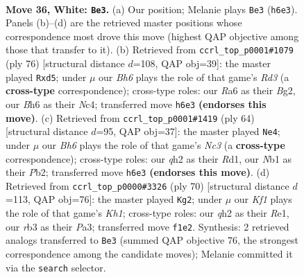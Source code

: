 \documentclass[11pt]{article}
\begin{document}
\clearpage

\begin{figure}[p]\centering
\begin{subfigure}{0.46\textwidth}\centering
\resizebox{\linewidth}{!}{%
\newchessgame
\chessboard[
  setfen={nr4k1/Q4pb1/R6B/4p3/4P3/1r3n2/1P3RNq/1N3K2 w - - 2 36},
  showmover=false,
  pgfstyle=straightmove, color=movearrow, markmove={h6-e3}
]}
\caption{}
\end{subfigure}\hfill
\begin{subfigure}{0.46\textwidth}\centering
\resizebox{\linewidth}{!}{%
\newchessgame
\chessboard[
  setfen={6rk/2p1q3/P2p3r/3b1p2/2N1P1n1/3R1Q2/6B1/4R1K1 w - - 0 39},
  showmover=false,
  pgfstyle=straightmove, color=movearrow, markmove={d3-d5}
]}
\caption{}
\end{subfigure}
\\[4pt]
\begin{subfigure}{0.46\textwidth}\centering
\resizebox{\linewidth}{!}{%
\newchessgame
\chessboard[
  setfen={3r2k1/3r2p1/5p2/Qpq1n2p/8/2Nb2PP/1P3PB1/R2R2K1 w - - 0 33},
  showmover=false,
  pgfstyle=straightmove, color=movearrow, markmove={c3-e4}
]}
\caption{}
\end{subfigure}\hfill
\begin{subfigure}{0.46\textwidth}\centering
\resizebox{\linewidth}{!}{%
\newchessgame
\chessboard[
  setfen={r6k/1p3Qnn/2p1r3/p7/3q2P1/P2BbRBP/2P5/4R2K w - - 9 36},
  showmover=false,
  pgfstyle=straightmove, color=movearrow, markmove={h1-g2}
]}
\caption{}
\end{subfigure}
\caption{\textbf{Move 36, White: \texttt{Be3}.} (a) Our position; Melanie plays \texttt{Be3} (\texttt{h6e3}). Panels (b)--(d) are the retrieved master positions whose correspondence most drove this move (highest QAP objective among those that transfer to it). (b) Retrieved from \texttt{ccrl\_top\_p0001\#1079} (ply 76) [structural distance $d$=108, QAP obj=39]: the master played \texttt{Rxd5}; under $\mu$ our \emph{Bh6} plays the role of that game's \emph{Rd3} (a \textbf{cross-type} correspondence); cross-type roles: our \emph{R}a6 as their \emph{B}g2, our \emph{B}h6 as their \emph{N}c4; transferred move \texttt{h6e3} \textbf{(endorses this move)}. (c) Retrieved from \texttt{ccrl\_top\_p0001\#1419} (ply 64) [structural distance $d$=95, QAP obj=37]: the master played \texttt{Ne4}; under $\mu$ our \emph{Bh6} plays the role of that game's \emph{Nc3} (a \textbf{cross-type} correspondence); cross-type roles: our \emph{q}h2 as their \emph{R}d1, our \emph{N}b1 as their \emph{P}b2; transferred move \texttt{h6e3} \textbf{(endorses this move)}. (d) Retrieved from \texttt{ccrl\_top\_p0000\#3326} (ply 70) [structural distance $d$=113, QAP obj=76]: the master played \texttt{Kg2}; under $\mu$ our \emph{Kf1} plays the role of that game's \emph{Kh1}; cross-type roles: our \emph{q}h2 as their \emph{R}e1, our \emph{r}b3 as their \emph{P}a3; transferred move \texttt{f1e2}. Synthesis: 2 retrieved analogs transferred to \texttt{Be3} (summed QAP objective 76, the strongest correspondence among the candidate moves); Melanie committed it via the \texttt{search} selector.}
\label{fig:thought-m70}
\end{figure}
\end{document}
